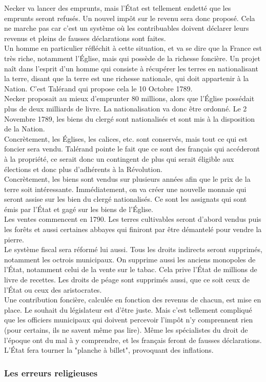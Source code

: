 \documentclass[10pt, a4paper, openany]{book}
\begin{document}
Necker va lancer des emprunts, mais l'État est tellement endetté que les emprunts seront refusés. Un nouvel impôt sur le revenu sera donc proposé. Cela ne marche pas car c'est un système où les contribuables doivent déclarer leurs revenus et pleins de fausses déclarations sont faites. \\
Un homme en particulier réfléchit à cette situation, et va se dire que la France est très riche, notamment l'Église, mais qui possède de la richesse foncière. Un projet naît dans l'esprit d'un homme qui consiste à récupérer les terres en nationalisant la terre, disant que la terre est une richesse nationale, qui doit appartenir à la Nation. C'est Talérand qui propose cela le 10 Octobre 1789. \\
Necker proposait au mieux d'emprunter 80 millions, alors que l'Église possédait plus de deux milliards de livre. La nationalisation va donc être ordonné. Le 2 Novembre 1789, les biens du clergé sont nationalisés et sont mis à la disposition de la Nation. \\
Concrètement, les Églises, les calices, etc. sont conservés, mais tout ce qui est foncier sera vendu. Talérand pointe le fait que ce sont des français qui accéderont à la propriété, ce serait donc un contingent de plus qui serait éligible aux élections et donc plus d'adhérents à la Révolution. \\
Concrètement, les biens sont vendus sur plusieurs années afin que le prix de la terre soit intéressante. Immédiatement, on va créer une nouvelle monnaie qui seront assise sur les bien du clergé nationalisés. Ce sont les assignats qui sont émis par l'État et gagé sur les biens de l'Église. \\
Les ventes commencent en 1790. Les terres cultivables seront d'abord vendus puis les forêts et aussi certaines abbayes qui finiront par être démantelé pour vendre la pierre. \\
Le système fiscal sera réformé lui aussi. Tous les droits indirects seront supprimés, notamment les octrois municipaux. On supprime aussi les anciens monopoles de l'État, notamment celui de la vente sur le tabac. Cela prive l'État de millions de livre de recettes. Les droits de péage sont supprimés aussi, que ce soit ceux de l'État ou ceux des aristocrates. \\
Une contribution foncière, calculée en fonction des revenus de chacun, est mise en place. Le souhait du législateur est d'être juste. Mais c'est tellement compliqué que les officiers municipaux qui doivent percevoir l'impôt n'y comprennent rien (pour certains, ils ne savent même pas lire). Même les spécialistes du droit de l'époque ont du mal à y comprendre, et les français feront de fausses déclarations. \\
L'État fera tourner la "planche à billet", provoquant des inflations. 

\subsubsection{Les erreurs religieuses}
\end{document}
